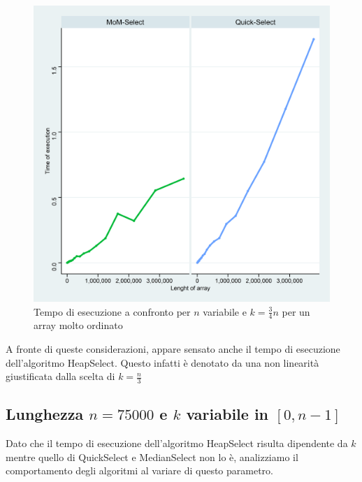 \documentclass{article}
\begin{document}
	\begin{figure}[h!]		
		\centering
  		\includegraphics[width=0.7\columnwidth]{images/MoM_Quick_graph_ordered.png}
  		\caption{Tempo di esecuzione a confronto per $n$ variabile e $k=\frac{3}{4}	n$ per un array molto ordinato}
  		\label{fig:graph2}
	\end{figure}
	
	A fronte di queste considerazioni, appare sensato anche il tempo di esecuzione dell'algoritmo HeapSelect. Questo infatti è denotato da una non linearità giustificata dalla scelta di $k=\frac{n}{3}$
		
	\newpage
	
	\subsection{Lunghezza $n=75000$ e $k$ variabile in $[0,n-1]$}
	Dato che il tempo di esecuzione dell'algoritmo HeapSelect risulta dipendente da $k$ mentre quello di QuickSelect e MedianSelect non lo è, analizziamo il comportamento degli algoritmi al variare di questo parametro.
	
\end{document}
